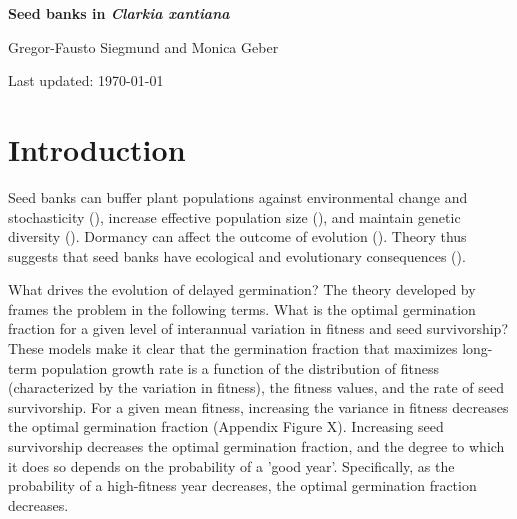 \documentclass[12pt, oneside, titlepage]{article}   	%
\begin{document}
\begin{titlepage}
   \begin{center}
       \vspace*{1cm}
 
       \textbf{Seed banks in \textit{Clarkia xantiana}}
 
       \vspace{1.5cm}
 
       Gregor-Fausto Siegmund and Monica Geber
 
   	Last updated: \today
 
   \end{center}
\end{titlepage}
%

\section*{Introduction}

Seed banks can buffer plant populations against environmental change and stochasticity (\cite{eager2014,paniw2017}), increase effective population size (\cite{nunney2002,waples2006}), and maintain genetic diversity (\cite{mccue1998b}). Dormancy can affect the outcome of evolution (\cite{ritland1983,heinrich2018}). Theory thus suggests that seed banks have ecological and evolutionary consequences (\cite{evans2005}). 

What drives the evolution of delayed germination? The theory developed by \cite{cohen1966} frames the problem in the following terms. What is the optimal germination fraction for a given level of interannual variation in fitness and seed survivorship? These models make it clear that the germination fraction that maximizes long-term population growth rate is a function of the distribution of fitness (characterized by the variation in fitness), the fitness values, and the rate of seed survivorship. For a given mean fitness, increasing the variance in fitness decreases the optimal germination fraction (Appendix Figure X). Increasing seed survivorship decreases the optimal germination fraction, and the degree to which it does so depends on the probability of a 'good year'. Specifically, as the probability of a high-fitness year decreases, the optimal germination fraction decreases. 


\end{document}

